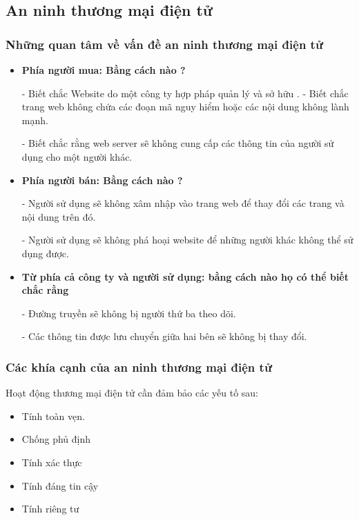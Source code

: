 \documentclass[12pt]{article}
\begin{document}
\subsection{An ninh thương mại điện tử}
\subsubsection{Những quan tâm về vấn đề an ninh thương mại điện tử}
\begin{itemize}
    \item \textbf{Phía người mua: Bằng cách nào ?}
    
      - Biết chắc Website do một công ty hợp pháp quản lý và sở hữu
      .
      - Biết chắc trang web không chứa các đoạn mã nguy hiểm hoặc các nội dung không lành mạnh.
      
      -  Biết chắc rằng web server sẽ không cung cấp các thông tin của người sử dụng cho một người khác.
      
    \item \textbf{Phía người bán: Bằng cách nào ?}
    
      - Người sử dụng sẽ không xâm nhập vào trang web để thay đổi các trang và nội dung trên đó. 

      - Người sử dụng sẽ không phá hoại website để những người khác không thể sử dụng được. 
      
     \item \textbf{Từ phía cả công ty và người sử dụng: bằng cách nào họ có thể biết chắc rằng}
     
     -  Đường truyền sẽ không bị người thứ ba theo dõi. 
     
     -  Các thông tin được lưu chuyển giữa hai bên sẽ không bị thay đổi.
\end{itemize}
\subsubsection{Các khía cạnh của an ninh thương mại điện tử}
Hoạt động thương mại điện tử cần đảm bảo các yếu tố sau:
\begin{itemize}
    \item Tính toàn vẹn.
    \item Chống phủ định
    \item Tính xác thực
    \item Tính đáng tin cậy
    \item Tính riêng tư
\end{itemize}
\end{document}
